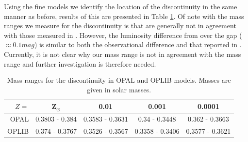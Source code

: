 %
%

Using the fine models we identify the location of the discontinuity in the same
manner as before, results of this are presented in Table
\ref{tab:fineMassRange}. Of note with the mass ranges we measure for the
discontinuity is that are generally not in agreement with those measured in
\citet{Mansfield2021}. However, the luminosity difference from over the gap
($\approx 0.1 mag$) is similar to both the observational difference and that
reported in \citet{Mansfield2021}. Currently, it is not clear why our mass
range is not in agreement with the \citet{Mansfield2021} mass range and further
investigation is therefore needed.

\begin{table}
	\centering
	\begin{tabular}{r | c c c c}
		\hline
		$Z=$ & Z$_{\odot}$ & 0.01 & 0.001 & 0.0001 \\
		\hline
		\hline
		OPAL & 0.3803 - 0.384 & 0.3583 - 0.3631 & 0.34 - 0.3448 & 0.362 - 0.3663 \\
		OPLIB & 0.374 - 0.3767 & 0.3526 - 0.3567 & 0.3358 - 0.3406 & 0.3577 - 0.3621
	\end{tabular}
	\caption{Mass ranges for the discontinuity in OPAL and OPLIB models. Masses
	are given in solar masses.}
	\label{tab:fineMassRange}
\end{table}
